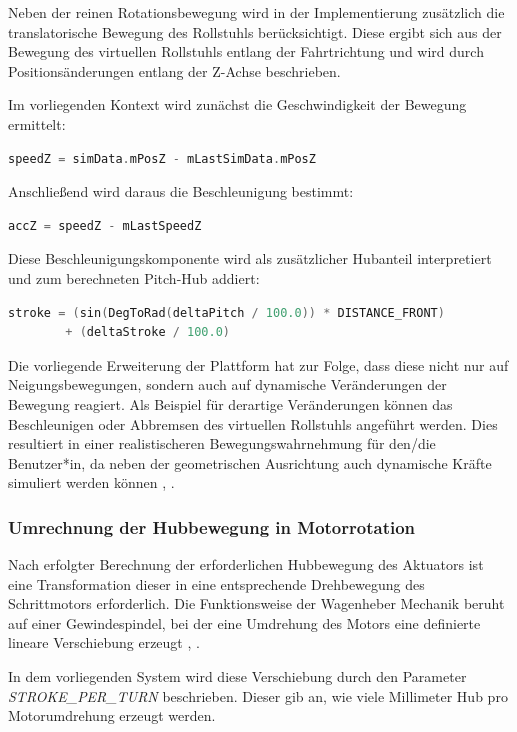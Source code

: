 Neben der reinen Rotationsbewegung wird in der Implementierung zusätzlich die translatorische Bewegung des Rollstuhls berücksichtigt. Diese ergibt sich aus der Bewegung des virtuellen Rollstuhls entlang der Fahrtrichtung und wird durch Positionsänderungen entlang der Z-Achse beschrieben.

Im vorliegenden Kontext wird zunächst die Geschwindigkeit der Bewegung ermittelt:
\begin{lstlisting}[language=C++, caption={Berechnung Geschwindigkeit}, label={lst:speed_calculation}]
        speedZ = simData.mPosZ - mLastSimData.mPosZ
\end{lstlisting}
Anschließend wird daraus die Beschleunigung bestimmt:
\begin{lstlisting}[language=C++, caption={Berechnung Beschleunigung}, label={lst:accelaration_calculation}]
        accZ = speedZ - mLastSpeedZ
\end{lstlisting}
Diese Beschleunigungskomponente wird als zusätzlicher Hubanteil interpretiert und zum berechneten Pitch-Hub addiert:
\begin{lstlisting}[language=C++, caption={Berechnung finale Neigung vorne}, label={lst:pitch_calculation_final}]
        stroke = (sin(DegToRad(deltaPitch / 100.0)) * DISTANCE_FRONT)
        + (deltaStroke / 100.0)
\end{lstlisting}
Die vorliegende Erweiterung der Plattform hat zur Folge, dass diese nicht nur auf Neigungsbewegungen, sondern auch auf dynamische Veränderungen der Bewegung reagiert. Als Beispiel für derartige Veränderungen können das Beschleunigen oder Abbremsen des virtuellen Rollstuhls angeführt werden. Dies resultiert in einer realistischeren Bewegungswahrnehmung für den/die Benutzer*in, da neben der geometrischen Ausrichtung auch dynamische Kräfte simuliert werden können \cite{Slater2016}, \cite{Steuer1992}.

\subsubsection{Umrechnung der Hubbewegung in Motorrotation}
Nach erfolgter Berechnung der erforderlichen Hubbewegung des Aktuators ist eine Transformation dieser in eine entsprechende Drehbewegung des Schrittmotors erforderlich. Die Funktionsweise der Wagenheber Mechanik beruht auf einer Gewindespindel, bei der eine Umdrehung des Motors eine definierte lineare Verschiebung erzeugt \cite{Siciliano1959}, \cite{Bauhaus}.

In dem vorliegenden System wird diese Verschiebung durch den Parameter \emph{STROKE\_PER\_TURN} beschrieben. Dieser gib an, wie viele Millimeter Hub pro Motorumdrehung erzeugt werden.

